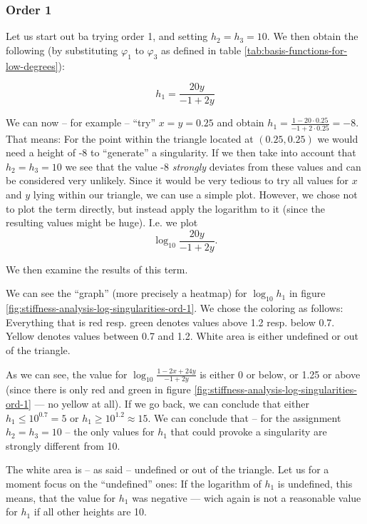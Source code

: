 \documentclass{article}
\renewcommand{\phi}{\varphi}
\begin{document}
\subsubsection{Order 1}
\label{sec:stiffness-analysis-singluarities-ord-1}

Let us start out ba trying order 1, and setting $h_2=h_3=10$. We then obtain the following (by substituting $\phi_1$ to $\phi_3$ as defined in table \ref{tab:basis-functions-for-low-degrees}):

\begin{equation*}
  h_1 = \frac{20y}{-1+2y}
\end{equation*}

We can now -- for example -- ``try'' $x=y=0.25$ and obtain $  h_1 = \frac{1-20\cdot 0.25}{-1+2\cdot 0.25} = -8$. That means: For the point within the triangle located at $(0.25, 0.25)$ we would need a height of -8 to ``generate'' a singularity. If we then take into account that $h_2=h_3=10$ we see that the value -8 \emph{strongly} deviates from these values and can be considered very unlikely. Since it would be very tedious to try all values for $x$ and $y$ lying within our triangle, we can use a simple plot. However, we chose not to plot the term directly, but instead apply the logarithm to it (since the resulting values might be huge). I.e. we plot
\begin{equation*}
\log_{10}\frac{20y}{-1+2y}.
\end{equation*}

We then examine the results of this term.

We can see the ``graph'' (more precisely a heatmap) for $\log_{10} h_1$ in figure \ref{fig:stiffness-analysis-log-singularities-ord-1}. We chose the coloring as follows: Everything that is red resp. green denotes values above 1.2 resp. below 0.7. Yellow denotes values between 0.7 and 1.2. White area is either undefined or out of the triangle.

As we can see, the value for $\log_{10}\frac{1-2x+24y}{-1+2y}$ is either 0 or below, or 1.25 or above (since there is only red and green in figure \ref{fig:stiffness-analysis-log-singularities-ord-1} --- no yellow at all). If we go back, we can conclude that either $h_1 \leq 10^{0.7} = 5$ or $h_1\geq 10^{1.2} \approx 15$. We can conclude that -- for the assignment $h_2=h_3=10$ -- the only values for $h_1$ that could provoke a singularity are strongly different from 10.

The white area is -- as said -- undefined or out of the triangle. Let us for a moment focus on the ``undefined'' ones: If the logarithm of $h_1$ is undefined, this means, that the value for $h_1$ was negative --- wich again is not a reasonable value for $h_1$ if all other heights are 10.
\end{document}
